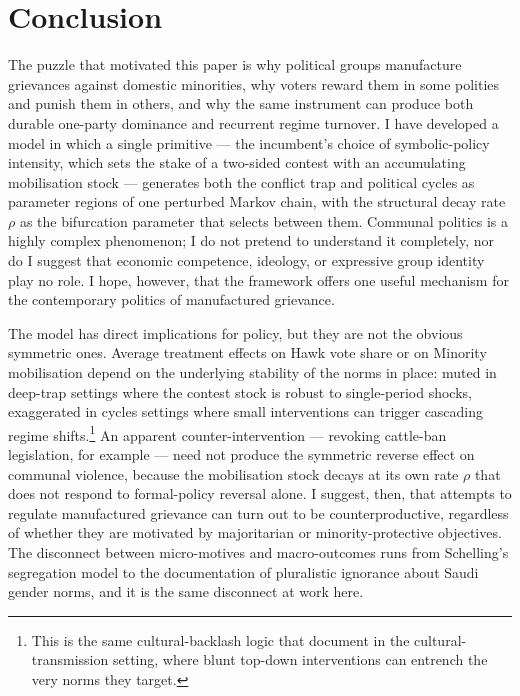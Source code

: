 \documentclass[11pt,twoside]{extarticle}
\begin{document}
\section{Conclusion}\label{sec:conclusion}

The puzzle that motivated this paper is why political groups manufacture grievances against domestic minorities, why voters reward them in some polities and punish them in others, and why the same instrument can produce both durable one-party dominance and recurrent regime turnover. I have developed a model in which a single primitive --- the incumbent's choice of symbolic-policy intensity, which sets the stake of a two-sided contest with an accumulating mobilisation stock --- generates both the conflict trap and political cycles as parameter regions of one perturbed Markov chain, with the structural decay rate $\rho$ as the bifurcation parameter that selects between them. Communal politics is a highly complex phenomenon; I do not pretend to understand it completely, nor do I suggest that economic competence, ideology, or expressive group identity play no role. I hope, however, that the framework offers one useful mechanism for the contemporary politics of manufactured grievance.

The model has direct implications for policy, but they are not the obvious symmetric ones. Average treatment effects on Hawk vote share or on Minority mobilisation depend on the underlying stability of the norms in place: muted in deep-trap settings where the contest stock is robust to single-period shocks, exaggerated in cycles settings where small interventions can trigger cascading regime shifts.\footnote{This is the same cultural-backlash logic that \citet{carvalhoKoyamaWilliamsResistingEducation2024} document in the cultural-transmission setting, where blunt top-down interventions can entrench the very norms they target.} An apparent counter-intervention --- revoking cattle-ban legislation, for example --- need not produce the symmetric reverse effect on communal violence, because the mobilisation stock decays at its own rate $\rho$ that does not respond to formal-policy reversal alone. I suggest, then, that attempts to regulate manufactured grievance can turn out to be counterproductive, regardless of whether they are motivated by majoritarian or minority-protective objectives. The disconnect between micro-motives and macro-outcomes runs from Schelling's segregation model to the documentation of pluralistic ignorance about Saudi gender norms, and it is the same disconnect at work here.
\end{document}
